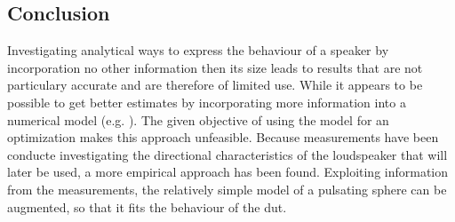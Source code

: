 \subsection{Conclusion}
Investigating analytical ways to express the behaviour of a speaker by incorporation no other information then its size leads to results that are not particulary accurate and are therefore of limited use. While it appears to be possible to get better estimates by incorporating more information into a numerical model (e.g. \citep{vanderkooy10}). The given objective of using the model for an optimization makes this approach unfeasible. Because measurements have been conducte investigating the directional characteristics of the loudspeaker that will later be used, a more empirical approach has been found. Exploiting information from the measurements, the relatively simple model of a pulsating sphere can be augmented, so that it fits the behaviour of the \gls{dut}.